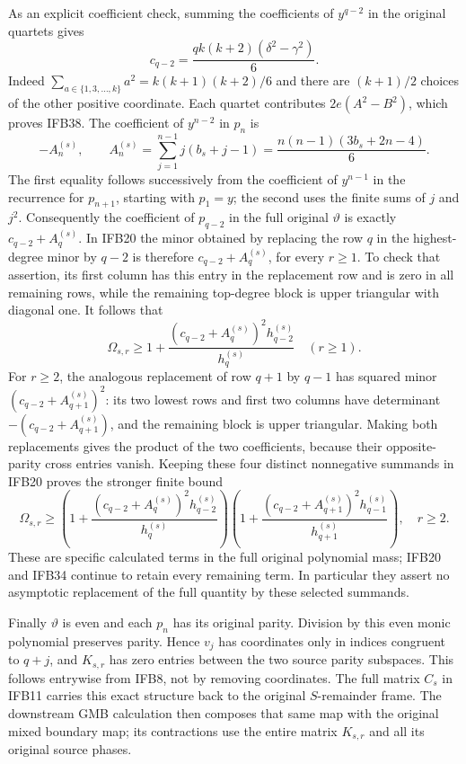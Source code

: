 As an explicit coefficient check, summing the coefficients of
$y^{q-2}$ in the original quartets gives
\[
 c_{q-2}=\frac{qk(k+2)(\delta^2-\gamma^2)}6.
 \tag{IFB38}
\]
Indeed $\sum_{a\in\{1,3,\ldots,k\}}a^2=k(k+1)(k+2)/6$ and
there are $(k+1)/2$ choices of the other positive coordinate.
Each quartet contributes $2e(A^2-B^2)$, which proves IFB38.
The coefficient of $y^{n-2}$ in $p_n$ is
\[
 -A_n^{(s)},\qquad
 A_n^{(s)}=\sum_{j=1}^{n-1}j(b_s+j-1)
          =\frac{n(n-1)(3b_s+2n-4)}6.
 \tag{IFB39}
\]
The first equality follows successively from the coefficient of
$y^{n-1}$ in the recurrence for $p_{n+1}$, starting with $p_1=y$;
the second uses the finite sums of $j$ and $j^2$. Consequently
the coefficient of $p_{q-2}$ in the full original $\vartheta$
is exactly $c_{q-2}+A_q^{(s)}$. In IFB20 the minor obtained by
replacing the row $q$ in the highest-degree minor by $q-2$ is
therefore $c_{q-2}+A_q^{(s)}$, for every $r\geq1$.
To check that assertion, its first column has this entry in the
replacement row and is zero in all remaining rows, while the
remaining top-degree block is upper triangular with diagonal one.
It follows that
\[
 \Omega_{s,r}\geq
 1+\frac{(c_{q-2}+A_q^{(s)})^2h_{q-2}^{(s)}}{h_q^{(s)}}
 \quad(r\geq1).
 \tag{IFB40}
\]
For $r\geq2$, the analogous replacement of row $q+1$ by $q-1$
has squared minor $(c_{q-2}+A_{q+1}^{(s)})^2$: its two lowest
rows and first two columns have determinant
$-(c_{q-2}+A_{q+1}^{(s)})$, and the remaining block is upper
triangular. Making both replacements gives the product of the
two coefficients, because their opposite-parity cross entries
vanish. Keeping these four distinct nonnegative summands in
IFB20 proves the stronger finite bound
\[
 \Omega_{s,r}\geq
 \left(1+\frac{(c_{q-2}+A_q^{(s)})^2h_{q-2}^{(s)}}{h_q^{(s)}}\right)
 \left(1+\frac{(c_{q-2}+A_{q+1}^{(s)})^2h_{q-1}^{(s)}}
                         {h_{q+1}^{(s)}}\right),\quad r\geq2.
 \tag{IFB41}
\]
These are specific calculated terms in the full original polynomial
mass; IFB20 and IFB34 continue to retain every remaining term.
In particular they assert no asymptotic replacement of the full
quantity by these selected summands.

Finally $\vartheta$ is even and each $p_n$ has its original parity.
Division by this even monic polynomial preserves parity. Hence
$v_j$ has coordinates only in indices congruent to $q+j$, and
$K_{s,r}$ has zero entries between the two source parity subspaces.
This follows entrywise from IFB8, not by removing coordinates.
The full matrix $C_s$ in IFB11 carries this exact structure back
to the original $S$-remainder frame. The downstream GMB calculation
then composes that same map with the original mixed boundary map;
its contractions use the entire matrix $K_{s,r}$ and all its
original source phases.
